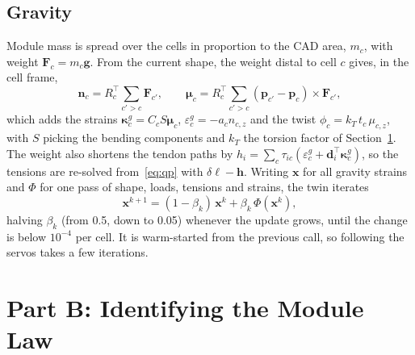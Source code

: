 \documentclass[conference]{IEEEtran}
\newcommand{\dl}{\delta\bm{\ell}}
\begin{document}
\subsection{Gravity}
Module mass is spread over the cells in proportion to the CAD area, $m_c$, with weight $\bm F_c=m_c\bm g$. From the
current shape, the weight distal to cell $c$ gives, in the cell frame,
\begin{equation}
\bm n_c=R_c^\top\!\!\sum_{c'>c}\!\bm F_{c'},\qquad
\bm\mu_c=R_c^\top\!\!\sum_{c'>c}\!(\bm p_{c'}-\bm p_c)\times\bm F_{c'},
\end{equation}
which adds the strains $\bm\kappa^g_c=C_cS\bm\mu_c$, $\varepsilon^g_c=-a_cn_{c,z}$ and the twist $\phi_c=k_T\,t_c\,\mu_{c,z}$,
with $S$ picking the bending components and $k_T$ the torsion factor of Section~\ref{sec:ident}. The weight also shortens
the tendon paths by $h_i=\sum_c\tau_{ic}(\varepsilon^g_c+\bm d_i^\top\bm\kappa^g_c)$, so the tensions are re-solved
from~\eqref{eq:qp} with $\dl-\bm h$. Writing $\bm x$ for all gravity strains and $\Phi$ for one pass of shape, loads,
tensions and strains, the twin iterates
\begin{equation}
\bm x^{k+1}=(1-\beta_k)\,\bm x^k+\beta_k\,\Phi(\bm x^k),
\label{eq:fp}
\end{equation}
halving $\beta_k$ (from 0.5, down to 0.05) whenever the update grows, until the change is below $10^{-4}$ per cell. It
is warm-started from the previous call, so following the servos takes a few iterations.

\section{Part B: Identifying the Module Law}\label{sec:ident}
\end{document}
